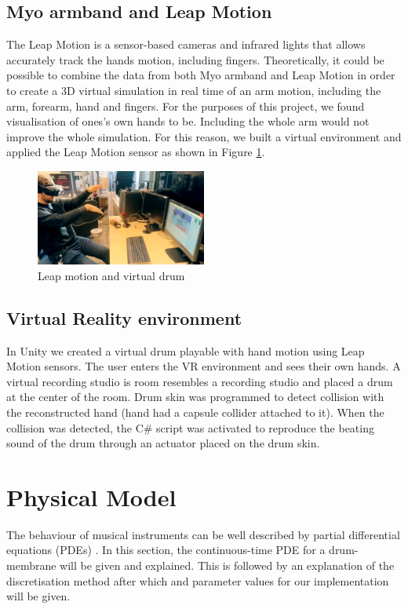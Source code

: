 \documentclass{vgtc}
\begin{document}
\subsection{Myo armband and Leap Motion}
The Leap Motion is a sensor-based cameras and infrared lights that allows accurately track the hands motion, including ﬁngers. Theoretically, it could be possible to combine the data from both Myo armband and Leap Motion in order to create a 3D virtual simulation in real time of an arm motion, including the arm, forearm, hand and fingers. For the purposes of this project, we found visualisation of ones's own hands to be. Including the whole arm would not improve the whole simulation. For this reason, we built a virtual environment and applied the Leap Motion sensor as shown in Figure \ref{fig:sl1}.
\begin{figure}[h]
\includegraphics[width=0.5\textwidth]{sil_drum}
\caption{Leap motion and virtual drum}
\centering
\label{fig:sl1}
\end{figure}
\subsection{Virtual Reality environment}
In Unity we created a virtual drum playable with hand motion using Leap Motion sensors. The user enters the VR environment and sees their own hands. A virtual recording studio is room  resembles a recording studio and placed a drum at the center of the room. Drum skin was programmed to detect collision with the reconstructed hand (hand had a capsule collider attached to it). When the collision was detected, the C\# script was activated to reproduce the beating sound of the drum through an actuator placed on the drum skin.

\section{Physical Model}\label{sec:PM}
The behaviour of musical instruments can be well described by partial differential equations (PDEs) \cite{Fletcher1998}. In this section, the continuous-time PDE for a drum-membrane will be given and explained. This is followed by an explanation of the discretisation method after which and parameter values for our implementation will be given. 
\end{document}
